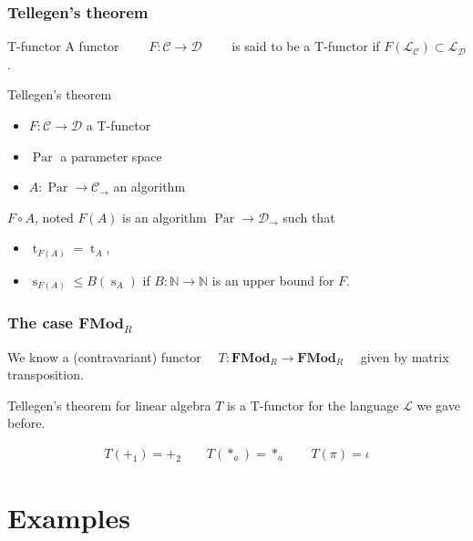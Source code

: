 \documentclass[10pt]{beamer}
\newcommand{\cat}[1]{\mathscr{#1}}
\newcommand{\lcat}[1]{\mathbf{#1}}
\newcommand{\C}{\cat{C}}
\newcommand{\D}{\cat{D}}
\renewcommand{\L}{\cat{L}}
\newcommand{\comp}{\circ}
\newcommand{\N}{\mathbb{N}}
\newcommand{\ra}{\rightarrow}
\DeclareMathOperator{\Time}{t}
\DeclareMathOperator{\Space}{s}
\DeclareMathOperator{\Par}{Par}
\begin{document}
\begin{frame}
  \frametitle{Tellegen's theorem}

  \begin{block}{T-functor}
    A functor $\qquad F:\C\ra\D \qquad$ is said to be a T-functor if
    $F(\L_\C) \subset \L_\D$.
  \end{block}

  \begin{block}{Tellegen's theorem}
    \begin{itemize}
    \item $F:\C\ra\D$ a T-functor
    \item $\Par$ a parameter space
    \item $A:\Par\ra\C_\ra$ an algorithm
    \end{itemize}

    $F\comp A$, noted $F(A)$ is an algorithm $\Par\ra\D_\ra$ such that
    \begin{itemize}
    \item $\Time_{F(A)} = \Time_A$,
    \item $\Space_{F(A)} \le B(\Space_A)$ if $B:\N\ra\N$ is an upper
      bound for $F$.
    \end{itemize}
  \end{block}
\end{frame}


\begin{frame}
  \frametitle{The case $\lcat{FMod}_R$}
  
  \begin{center}
    We know a (contravariant) functor $\quad
    T:\lcat{FMod}_R\ra\lcat{FMod}_R\quad$ given by matrix
    transposition.
  \end{center}

  \begin{block}{Tellegen's theorem for linear algebra}
    $T$ is a T-functor for the language $\L$ we gave before.
  \end{block}

  \begin{align*}
    T(+_1) = +_2 \qquad T(*_a) = *_a \qquad T(\pi) = \iota
  \end{align*}
\end{frame}



\section{Examples}
\end{document}
